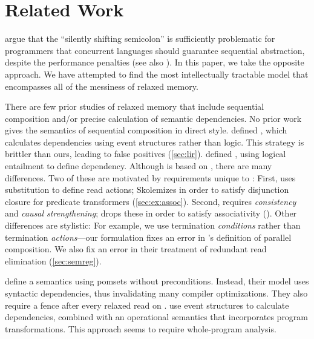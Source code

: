 \section{Related Work}
\label{sec:related}

\citet{DBLP:conf/snapl/MarinoMMNS15} argue that the ``silently shifting
semicolon'' is sufficiently problematic for programmers that concurrent
languages should guarantee sequential abstraction, despite the performance
penalties (see also \citet{10.1145/3462206}).  In this paper, we take the
opposite approach.  We have attempted to find the most intellectually
tractable model that encompasses all of the messiness of relaxed memory.

There are few prior studies of relaxed memory that include sequential
composition and/or precise calculation of semantic dependencies.  No prior
work gives the semantics of sequential composition in direct style.
\citet{DBLP:conf/esop/PaviottiCPWOB20} defined \MRD{}, which calculates
dependencies using event structures rather than logic.  This strategy is
brittler than ours, leading to false positives (\textsection\ref{sec:lir}).
\citet{DBLP:journals/pacmpl/JagadeesanJR20} defined \PwP{}, using logical
entailment to define dependency.  Although \PwT{} is based on \PwP{}, there
are many differences.  Two of these are motivated by requirements unique to
\PwT{}: First, \PwP{} uses substitution to define read actions; \PwT{}
Skolemizes in order to satisfy disjunction closure for predicate transformers
(\textsection\ref{sec:ex:assoc}).  Second, \PwP{} requires \emph{consistency}
and \emph{causal strengthening}; \PwT{} drops these in order to satisfy
associativity ().  Other differences are stylistic: For
example, we use termination \emph{conditions} rather than termination
\emph{actions}---our formulation fixes an error in
\citeauthor{DBLP:journals/pacmpl/JagadeesanJR20}'s definition of parallel
composition.  We also fix an error in their treatment of redundant read
elimination (\textsection\ref{sec:semreg}).

\citet{DBLP:journals/corr/abs-1804-04214} define a semantics
using pomsets without preconditions. Instead, their model uses syntactic
dependencies, thus invalidating many compiler optimizations.  They also
require a fence after every relaxed read on \armeight{}.
%
\citet{Pichon-Pharabod:2016:CSR:2837614.2837616} use event structures to
calculate dependencies, combined with an operational semantics that
incorporates program transformations.  This approach seems to require
whole-program analysis.




